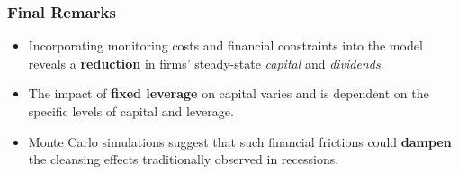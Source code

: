 \documentclass{beamer}
\begin{document}
\begin{frame}
    \frametitle{Final Remarks}
    
    \begin{itemize}
        \item Incorporating monitoring costs and financial constraints into the model reveals a \textbf{reduction} in firms' steady-state \textit{capital} and \textit{dividends}.
        \item The impact of \textbf{fixed leverage} on capital varies and is dependent on the specific levels of capital and leverage.
        \item Monte Carlo simulations suggest that such financial frictions could \textbf{dampen} the cleansing effects traditionally observed in recessions.
    \end{itemize}

\end{frame}
\end{document}
